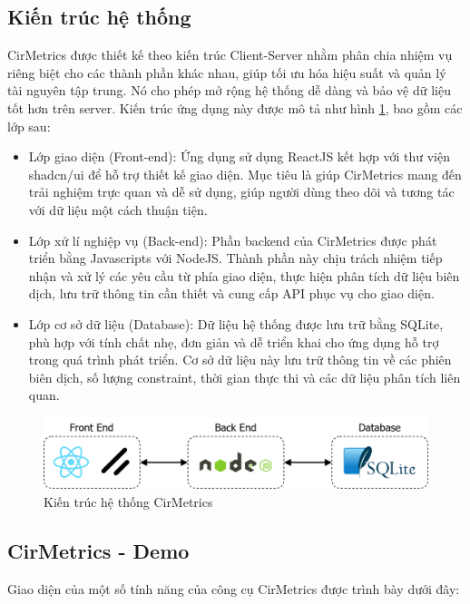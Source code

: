 \subsection{Kiến trúc hệ thống}

CirMetrics được thiết kế theo kiến trúc Client-Server nhằm phân chia nhiệm vụ riêng biệt cho các thành phần khác nhau, giúp tối ưu hóa hiệu suất và quản lý tài nguyên tập trung. Nó cho phép mở rộng hệ thống dễ dàng và bảo vệ dữ liệu tốt hơn trên server. Kiến trúc ứng dụng này được mô tả như hình \ref{fig:chapter6-ToolsApp}, bao gồm các lớp sau:
\begin{itemize}
    \item Lớp giao diện (Front-end): Ứng dụng sử dụng ReactJS kết hợp với thư viện shadcn/ui để hỗ trợ thiết kế giao diện. Mục tiêu là giúp CirMetrics mang đến trải nghiệm trực quan và dễ sử dụng, giúp người dùng theo dõi và tương tác với dữ liệu một cách thuận tiện.
    \item Lớp xử lí nghiệp vụ (Back-end): Phần backend của CirMetrics được phát triển bằng Javascripts với NodeJS. Thành phần này chịu trách nhiệm tiếp nhận và xử lý các yêu cầu từ phía giao diện, thực hiện phân tích dữ liệu biên dịch, lưu trữ thông tin cần thiết và cung cấp API phục vụ cho giao diện.
    \item Lớp cơ sở dữ liệu (Database): Dữ liệu hệ thống được lưu trữ bằng SQLite, phù hợp với tính chất nhẹ, đơn giản và dễ triển khai cho ứng dụng hỗ trợ trong quá trình phát triển. Cơ sở dữ liệu này lưu trữ thông tin về các phiên biên dịch, số lượng constraint, thời gian thực thi và các dữ liệu phân tích liên quan.
\end{itemize}
\begin{figure}[H]
    \centering
    \includegraphics[width=\textwidth]{imgs/ToolsApp.png}
    \caption{Kiến trúc hệ thống CirMetrics}
    \label{fig:chapter6-ToolsApp}
\end{figure}

\subsection{CirMetrics - Demo}
Giao diện của một số tính năng của công cụ CirMetrics được trình bày dưới đây:
